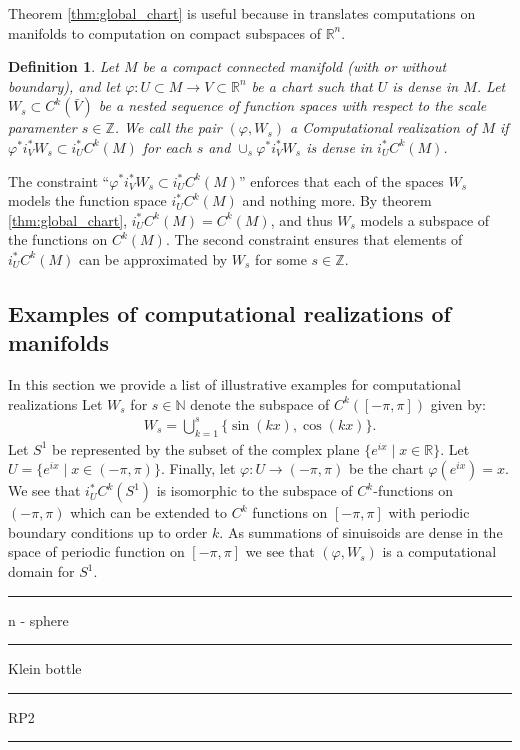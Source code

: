 \documentclass[12pt]{amsart}
\renewcommand{\phi}{\varphi}
\newtheorem{defn}{Definition}
\newenvironment{example}
  { \newline {\bf Example:} }
  {\rule{1ex}{1ex} }
\begin{document}
  Theorem \ref{thm:global_chart} is useful because in translates computations on manifolds to computation on compact subspaces of $\mathbb{R}^n$.

\begin{defn}
  Let $M$ be a compact connected manifold (with or without boundary), and let $\phi:U \subset M \to V \subset \mathbb{R}^n$ be a chart such that $U$ is dense in $M$.
  Let $W_s \subset C^k(\bar{V})$ be a nested sequence of function spaces
  with respect to the scale paramenter $s \in \mathbb{Z}$.
  We call the pair $(\phi, W_s)$ a \emph{Computational realization of $M$}
  if $\phi^* i_V^*W_s \subset i_{U}^* C^k(M)$ for each $s$ and $\cup_s \phi^*i_V^*W_s$ is dense in $i_{U}^*C^k(M)$.
\end{defn}

The constraint ``$\phi^*i_V^*W_s \subset i_U^* C^k(M)$'' enforces that each of the spaces $W_s$ models the function space $i_U^* C^k(M)$ and nothing more.
By theorem \ref{thm:global_chart}, $i_U^* C^k(M) = C^k(M)$, and thus $W_s$ models a subspace of the functions on $C^k(M)$.
The second constraint ensures that elements of $i_U^* C^k(M)$ can be approximated by $W_s$ for some $s \in \mathbb{Z}$.

\subsection{Examples of computational realizations of manifolds}
In this section we provide a list of illustrative examples for computational realizations
\begin{example}
Let $W_s$ for $s \in \mathbb{N}$ denote the subspace of $C^k( [-\pi,\pi])$ given by:
\begin{align*}
  W_s = \bigcup_{k=1}^{s} \{ \sin( k x),\cos( kx) \}.
\end{align*}
Let $S^1$ be represented by the subset of the complex plane $\{ e^{ix} \mid x \in \mathbb{R} \}$.
Let $U = \{ e^{ix} \mid x \in (-\pi,\pi) \}$.
Finally, let $\phi: U \to (-\pi,\pi)$ be the chart $\phi( e^{ix}) = x$.
We see that $i_U^*C^k(S^1)$ is isomorphic to the subspace of $C^k$-functions on $(-\pi,\pi)$
which can be extended to $C^k$ functions on $[-\pi,\pi]$ with periodic boundary conditions up to order $k$.
As summations of sinuisoids are dense in the space of periodic function on $[-\pi,\pi]$ we see that $(\phi,W_s)$ is a computational domain for $S^1$.
\end{example}
\begin{example}
n - sphere
\end{example}
\begin{example}
Klein bottle
\end{example}
\begin{example}
RP2
\end{example}
\end{document}
